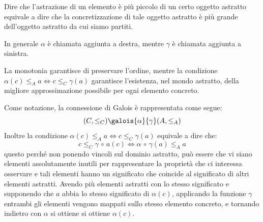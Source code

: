\begin{figure}[H]
    \centering
\end{figure}
Dire che l'astrazione di un elemento è più piccolo di un certo oggetto 
astratto equivale a dire che la concretizzazione di tale oggetto astratto 
è più grande dell'oggetto astratto da cui siamo partiti.

In generale $\alpha$ è chiamata aggiunta a destra,
mentre $\gamma$ è chiamata aggiunta a sinistra.

La monotonia garantisce di preservare l'ordine, mentre la condizione 
$\alpha(c) \leq_A a \iff c \leq_C \gamma(a)$ garantisce l'esistenza,
nel mondo astratto, della migliore approssimazione possibile per 
ogni elemento concreto.

Come notazione, la connessione di Galois è rappresentata
come segue: 
\[(C, \leq_C) \galois{\alpha}{\gamma} (A, \leq_A)\]
Inoltre la condizione $\alpha(c) \leq_A a \iff c \leq_C \gamma(a)$
equivale a dire che:
\[c \leq_C \gamma \, \circ \, a(c) \iff \alpha \, \circ \, \gamma(a) \leq_A a\]
questo perché non ponendo vincoli sul dominio astratto, può essere che 
vi siano elementi assolutamente inutili per rappresentare la proprietà
che ci interessa osservare e tali elementi hanno un significato che coincide al significato di 
altri elementi astratti. Avendo più elementi astratti con lo stesso significato e supponendo che 
$a$ abbia lo stesso significato di $\alpha(c)$, applicando la funzione $\gamma$ entrambi gli elementi 
vengono mappati sullo stesso elemento concreto, e tornando indietro con $\alpha$ si ottiene
si ottiene $\alpha(c)$.

